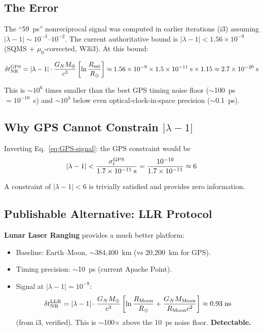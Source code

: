 \documentclass[11pt,a4paper]{article}
\newcounter{findingctr}
\newenvironment{finding}[1][]{%
  \refstepcounter{findingctr}%
  \begin{tcolorbox}[colback=blue!3!white, colframe=blue!50!black,
    title=\textbf{Finding \thefindingctr: #1}]
}{%
  \end{tcolorbox}%
}
\newcommand{\ee}[1]{\times 10^{#1}}
\begin{document}
\begin{finding}[\textbf{GPS RETRACTED}: Signal $10^6\times$ Below
  Noise at Current $|\lambda - 1|$ Bound]
\label{find:GPS}

\subsection*{The Error}

The ``59~ps'' nonreciprocal signal was computed in earlier
iterations (i3) assuming $|\lambda - 1| \sim 10^{-3}$--$10^{-2}$.
The current authoritative bound is $|\lambda - 1| < 1.56 \ee{-9}$
(SQMS + $\mu_0$-corrected, W3i3). At this bound:

\begin{equation}
\delta t_{\rm NR}^{\rm GPS} = |\lambda - 1| \cdot
\frac{G_N M_\oplus}{c^3}\left[\ln\frac{R_{\rm sat}}{R_\oplus}\right]
\approx 1.56 \ee{-9} \times 1.5 \ee{-11}\;\text{s} \times 1.15
\approx 2.7 \ee{-20}\;\text{s}
\label{eq:GPS-signal}
\end{equation}

This is $\sim 10^{6}$ times smaller than the best GPS timing
noise floor ($\sim$100~ps $= 10^{-10}$~s) and $\sim 10^{4}$
below even optical-clock-in-space precision ($\sim$0.1~ps).

\subsection*{Why GPS Cannot Constrain $|\lambda - 1|$}

Inverting Eq.~\eqref{eq:GPS-signal}: the GPS constraint would be
\begin{equation}
|\lambda - 1| < \frac{\sigma_t^{\rm GPS}}{1.7 \ee{-11}\;\text{s}}
= \frac{10^{-10}}{1.7 \ee{-11}} \approx 6
\end{equation}

A constraint of $|\lambda - 1| < 6$ is trivially satisfied
and provides zero information.

\subsection*{Publishable Alternative: LLR Protocol}
\label{sec:GPSabstract}

\textbf{Lunar Laser Ranging} provides a much better platform:
\begin{itemize}[nosep]
\item Baseline: Earth--Moon, $\sim$384,400~km (vs 20,200~km for GPS).
\item Timing precision: $\sim$10~ps (current Apache Point).
\item Signal at $|\lambda - 1| = 10^{-9}$:
  \begin{equation}
  \delta t_{\rm NR}^{\rm LLR} = |\lambda - 1| \cdot
  \frac{G_N M_\oplus}{c^3}\left[\ln\frac{R_{\rm Moon}}{R_\oplus}
  + \frac{G_N M_{\rm Moon}}{R_{\rm Moon}c^2}\right]
  \approx 0.93\;\text{ns}
  \end{equation}
  (from i3, verified). This is $\sim$100$\times$ above the
  10~ps noise floor. \textbf{Detectable.}
\end{itemize}


\end{finding}
\end{document}
